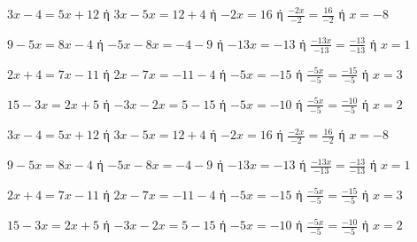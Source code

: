 \begin{alist}
\item $ 3x-4=5x+12 $ ή $ 3x-5x=12+4 $ ή $ -2x=16 $ ή $ \frac{-2x}{-2}=\frac{16}{-2} $ ή $ x=-8 $
\item $ 9-5x=8x-4 $ ή $ -5x-8x=-4-9 $ ή $ -13x=-13 $ ή $ \frac{-13x}{-13}=\frac{-13}{-13} $ ή $ x=1 $
\item $ 2x+4=7x-11 $ ή $ 2x-7x=-11-4 $ ή $ -5x=-15 $ ή $ \frac{-5x}{-5}=\frac{-15}{-5} $ ή $ x=3 $
\item $ 15-3x=2x+5 $ ή $ -3x-2x=5-15 $ ή $ -5x=-10 $ ή $ \frac{-5x}{-5}=\frac{-10}{-5} $ ή $ x=2 $
\end{alist}
\begin{alist}
\item $ 3x-4=5x+12 $ ή $ 3x-5x=12+4 $ ή $ -2x=16 $ ή $ \frac{-2x}{-2}=\frac{16}{-2} $ ή $ x=-8 $
\item $ 9-5x=8x-4 $ ή $ -5x-8x=-4-9 $ ή $ -13x=-13 $ ή $ \frac{-13x}{-13}=\frac{-13}{-13} $ ή $ x=1 $
\item $ 2x+4=7x-11 $ ή $ 2x-7x=-11-4 $ ή $ -5x=-15 $ ή $ \frac{-5x}{-5}=\frac{-15}{-5} $ ή $ x=3 $
\item $ 15-3x=2x+5 $ ή $ -3x-2x=5-15 $ ή $ -5x=-10 $ ή $ \frac{-5x}{-5}=\frac{-10}{-5} $ ή $ x=2 $
\end{alist}
